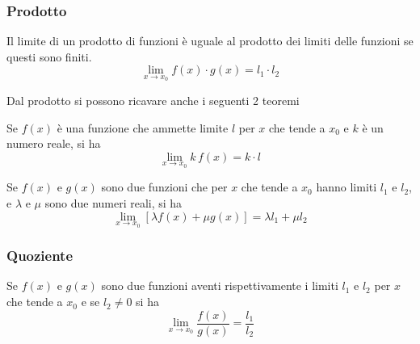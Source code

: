 \subsubsection{Prodotto}
\begin{prodottoLimiti}\hypertarget{teor:prodottoLimiti}{}
	Il limite di un prodotto di funzioni è uguale al prodotto dei limiti delle funzioni se questi sono
	finiti.
	\begin{equation*}
	\lim\limits_{x\to x_0}f(x)\cdot g(x)=l_1\cdot l_2
	\end{equation*}
\end{prodottoLimiti}
Dal prodotto si possono ricavare anche i seguenti 2 teoremi
\begin{prodottoLimiti1}
	Se $f(x)$ è una funzione che ammette limite $l$ per $x$ che tende a $x_0$ e $k$ è un numero reale,
	si ha
	\begin{equation*}
	\lim\limits_{x\to x_0}k\,f(x) = k\cdot l
	\end{equation*}
\end{prodottoLimiti1}
\begin{prodottoLimiti2}
	Se $f(x)$ e $g(x)$ sono due funzioni che per $x$ che tende a $x_0$ hanno limiti $l_1$ e $l_2$, e
	$\lambda$ e $\mu$ sono due numeri reali, si ha
	\begin{equation*}
	\lim\limits_{x\to x_0}[\lambda f(x)+\mu g(x)]=\lambda l_1+\mu l_2
	\end{equation*}
\end{prodottoLimiti2}

\subsubsection{Quoziente}
\begin{quozienteLimiti}
	Se $f(x)$ e $g(x)$ sono due funzioni aventi rispettivamente i limiti $l_1$ e $l_2$ per $x$ che 
	tende a $x_0$ e se $l_2\neq0$ si ha
	\begin{equation*}
	\lim\limits_{x\to x_0}\frac{f(x)}{g(x)}=\frac{l_1}{l_2}
	\end{equation*}
\end{quozienteLimiti}

